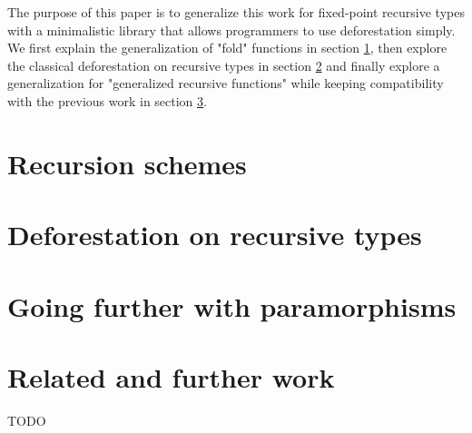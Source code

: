 \documentclass[format=sigplan]{acmart}
\begin{document}
The purpose of this paper is to generalize this work for fixed-point recursive types with a minimalistic library that allows programmers to use deforestation simply. We first explain the generalization of "fold" functions in section \ref{sec:recschemes}, then explore the classical deforestation on recursive types in section \ref{sec:rectypes} and finally explore a generalization for "generalized recursive functions" while keeping compatibility with the previous work in section \ref{sec:para}.

\section{Recursion schemes}
\label{sec:recschemes}


\section{Deforestation on recursive types}
\label{sec:rectypes}


\section{Going further with paramorphisms}
\label{sec:para}


\section{Related and further work}
\label{sec:related}


\begin{acks}
TODO
\end{acks}




\end{document}
